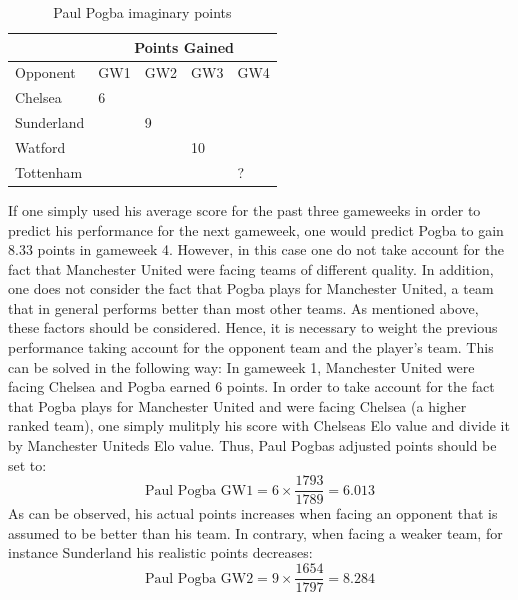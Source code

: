 \begin{table}[H]
\centering
\caption{Paul Pogba imaginary points}
\label{my-label}
\begin{tabular}{|l|l|l|l|l|}
\hline
\multicolumn{1}{|c|}{} & \multicolumn{4}{c|}{Points Gained} \\ \hline
Opponent               & GW1        & GW2       & GW3    & GW4   \\
\hline
Chelsea                & 6          &           &        &       \\
Sunderland             &            & 9         &        &       \\
Watford                &            &           & 10     &         \\
Tottenham              &            &           &        & ?      \\
\hline
\end{tabular}
\end{table}

If one simply used his average score for the past three gameweeks in order to predict his performance for the next gameweek, one would predict Pogba to gain 8.33 points in gameweek 4. However, in this case one do not take account for the fact that Manchester United were facing teams of different quality. In addition, one does not consider the fact that Pogba plays for Manchester United, a team that in general performs better than most other teams. As mentioned above, these factors should be considered. Hence, it is necessary to weight the previous performance taking account for the opponent team and the player's team. This can be solved in the following way: 
\newpar
In gameweek 1, Manchester United were facing Chelsea and Pogba earned 6 points. In order to take account for the fact that Pogba plays for Manchester United and were facing Chelsea (a higher ranked team), one simply mulitply his score with Chelseas Elo value and divide it by Manchester Uniteds Elo value. Thus, Paul Pogbas adjusted points should be set to:
\begin{equation*}
    \textrm{Paul Pogba GW1} = 6 \times \frac{1793}{1789} = 6.013 
\end{equation*}
As can be observed, his actual points increases when facing an opponent that is assumed to be better than his team. In contrary, when facing a weaker team, for instance Sunderland his realistic points decreases: 
\begin{equation*}
    \textrm{Paul Pogba GW2} = 9 \times \frac{1654}{1797} = 8.284 
\end{equation*}

